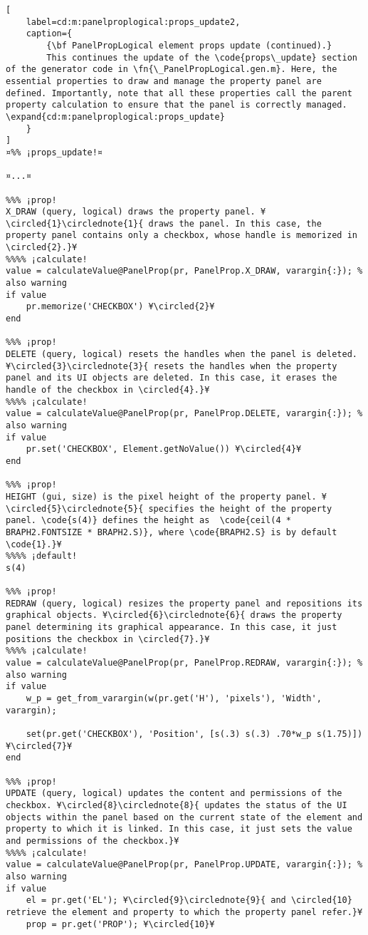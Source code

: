 \documentclass{tufte-handout}
\begin{document}
\begin{lstlisting}[
	label=cd:m:panelproplogical:props_update2,
	caption={
		{\bf PanelPropLogical element props update (continued).}
		This continues the update of the \code{props\_update} section of the generator code in \fn{\_PanelPropLogical.gen.m}. Here, the essential properties to draw and manage the property panel are defined. Importantly, note that all these properties call the parent property calculation to ensure that the panel is correctly managed. \expand{cd:m:panelproplogical:props_update}
	}
]
¤%% ¡props_update!¤

¤...¤

%%% ¡prop!
X_DRAW (query, logical) draws the property panel. ¥\circled{1}\circlednote{1}{ draws the panel. In this case, the property panel contains only a checkbox, whose handle is memorized in \circled{2}.}¥
%%%% ¡calculate!
value = calculateValue@PanelProp(pr, PanelProp.X_DRAW, varargin{:}); % also warning
if value
	pr.memorize('CHECKBOX') ¥\circled{2}¥
end

%%% ¡prop!
DELETE (query, logical) resets the handles when the panel is deleted. ¥\circled{3}\circlednote{3}{ resets the handles when the property panel and its UI objects are deleted. In this case, it erases the handle of the checkbox in \circled{4}.}¥
%%%% ¡calculate!
value = calculateValue@PanelProp(pr, PanelProp.DELETE, varargin{:}); % also warning
if value
	pr.set('CHECKBOX', Element.getNoValue()) ¥\circled{4}¥
end

%%% ¡prop!
HEIGHT (gui, size) is the pixel height of the property panel. ¥\circled{5}\circlednote{5}{ specifies the height of the property panel. \code{s(4)} defines the height as  \code{ceil(4 * BRAPH2.FONTSIZE * BRAPH2.S)}, where \code{BRAPH2.S} is by default \code{1}.}¥
%%%% ¡default!
s(4)

%%% ¡prop!
REDRAW (query, logical) resizes the property panel and repositions its graphical objects. ¥\circled{6}\circlednote{6}{ draws the property panel determining its graphical appearance. In this case, it just positions the checkbox in \circled{7}.}¥
%%%% ¡calculate!
value = calculateValue@PanelProp(pr, PanelProp.REDRAW, varargin{:}); % also warning
if value
	w_p = get_from_varargin(w(pr.get('H'), 'pixels'), 'Width', varargin);

	set(pr.get('CHECKBOX'), 'Position', [s(.3) s(.3) .70*w_p s(1.75)]) ¥\circled{7}¥
end

%%% ¡prop!
UPDATE (query, logical) updates the content and permissions of the checkbox. ¥\circled{8}\circlednote{8}{ updates the status of the UI objects within the panel based on the current state of the element and property to which it is linked. In this case, it just sets the value and permissions of the checkbox.}¥
%%%% ¡calculate!
value = calculateValue@PanelProp(pr, PanelProp.UPDATE, varargin{:}); % also warning
if value
	el = pr.get('EL'); ¥\circled{9}\circlednote{9}{ and \circled{10} retrieve the element and property to which the property panel refer.}¥
	prop = pr.get('PROP'); ¥\circled{10}¥


\end{lstlisting}
\end{document}
